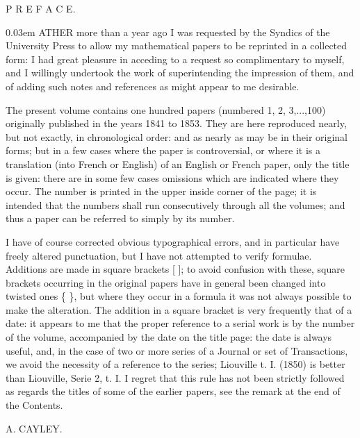 \documentclass[10pt]{article}
\newcommand{\sourcepagebreak}{\newpage}
\begin{document}
\vspace*{0.08\textheight}
\begin{center}
{\Large P R E F A C E.}
\end{center}

\vspace{2.4em}
{\fontsize{10.6}{12.5}\selectfont
{}\kern0.03em ATHER more than a year ago I was requested by the Syndics of the
University Press to allow my mathematical papers to be reprinted in
a collected form: I had great pleasure in acceding to a request so
complimentary to myself, and I willingly undertook the work of superintending
the impression of them, and of adding such notes and references as might
appear to me desirable.

The present volume contains one hundred papers (numbered 1, 2, 3,...,100)
originally published in the years 1841 to 1853. They are here reproduced
nearly, but not exactly, in chronological order: and as nearly as may be
in their original forms; but in a few cases where the paper is controversial,
or where it is a translation (into French or English) of an English or
French paper, only the title is given: there are in some few cases omissions
which are indicated where they occur. The number is printed in the upper
inside corner of the page; it is intended that the numbers shall run
consecutively through all the volumes; and thus a paper can be referred
to simply by its number.

I have of course corrected obvious typographical errors, and in particular
have freely altered punctuation, but I have not attempted to verify formulae.
Additions are made in square brackets [ ]; to avoid confusion with these,
square brackets occurring in the original papers have in general been
changed into twisted ones \{ \}, but where they occur in a formula it was
not always possible to make the alteration. The addition in a square
bracket is very frequently that of a date: it appears to me that the
proper reference to a serial work is by the number of the volume, accompanied
by the date on the title page: the date is always useful, and, in the case
of two or more series of a Journal or set of Transactions, we avoid the
necessity of a reference to the series; Liouville t. I. (1850) is better
than Liouville, Serie 2, t. I. I regret that this rule has not been
strictly followed as regards the titles of some of the earlier papers, see
the remark at the end of the Contents.

\vspace{1.6em}
\hfill A. CAYLEY.
\par}
\sourcepagebreak

\null
\end{document}
